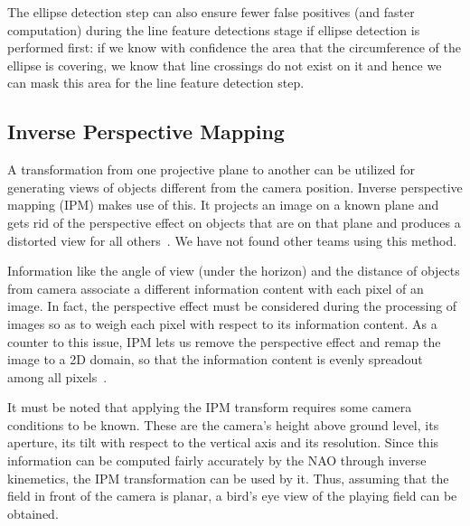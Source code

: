 \documentclass[	DIV=calc,%
							paper=a4,%
							fontsize=9pt,%
							twocolumn]{scrartcl}	 					%
\begin{document}
The ellipse detection step can also ensure fewer false positives (and faster computation) during the line feature detections stage if ellipse detection is performed first: if we know with confidence the area that the circumference of the ellipse is covering, we know that line crossings do not exist on it and hence we can mask this area for the line feature detection step.

\subsection{Inverse Perspective Mapping}
A transformation from one projective plane to another can be utilized for generating views of objects different from the camera position. Inverse perspective mapping (IPM) makes use of this. It projects an image on a known plane and gets rid of the perspective effect on objects that are on that plane and produces a distorted view for all others~\cite{IPM2}.  We have not found other teams using this method.

Information like the angle of view (under the horizon) and the distance of objects from camera associate a different information content with each pixel of an image. In fact, the perspective effect must be considered during the processing of images so as to weigh each pixel with respect to its information content. As a counter to this issue, IPM lets us remove the perspective effect and remap the image to a 2D domain, so that the information content is evenly spreadout among all pixels~\cite{IPMWeb}. 

It must be noted that applying the IPM transform requires some camera conditions to be known. These are the camera's height above ground level, its aperture, its tilt with respect to the vertical axis and its resolution. Since this information can be %
computed fairly accurately by the NAO through inverse kinemetics, the IPM transformation can be used by it. Thus, assuming that the field in front of the camera is planar, a bird's eye view of the playing field can be obtained.
\end{document}
